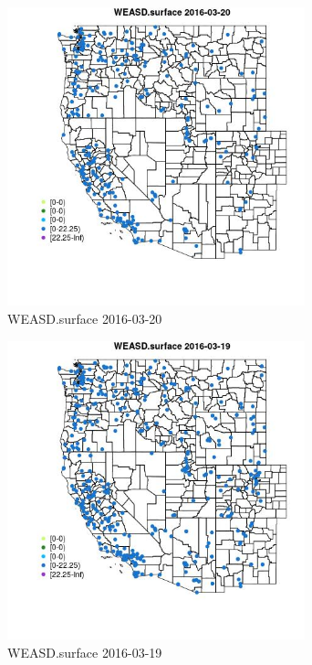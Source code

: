 \begin{figure} 
\centering  
\includegraphics[width=0.77\textwidth]{Code_Outputs/Report_ML_input_PM25_Step4_part_e_de_duplicated_aveswNAs_MapObsWEASDsurface2016-03-20.jpg} 
\caption{\label{fig:Report_ML_input_PM25_Step4_part_e_de_duplicated_aveswNAsMapObsWEASDsurface2016-03-20}WEASD.surface 2016-03-20} 
\end{figure} 
 

\clearpage 

\begin{figure} 
\centering  
\includegraphics[width=0.77\textwidth]{Code_Outputs/Report_ML_input_PM25_Step4_part_e_de_duplicated_aveswNAs_MapObsWEASDsurface2016-03-19.jpg} 
\caption{\label{fig:Report_ML_input_PM25_Step4_part_e_de_duplicated_aveswNAsMapObsWEASDsurface2016-03-19}WEASD.surface 2016-03-19} 
\end{figure} 
 

